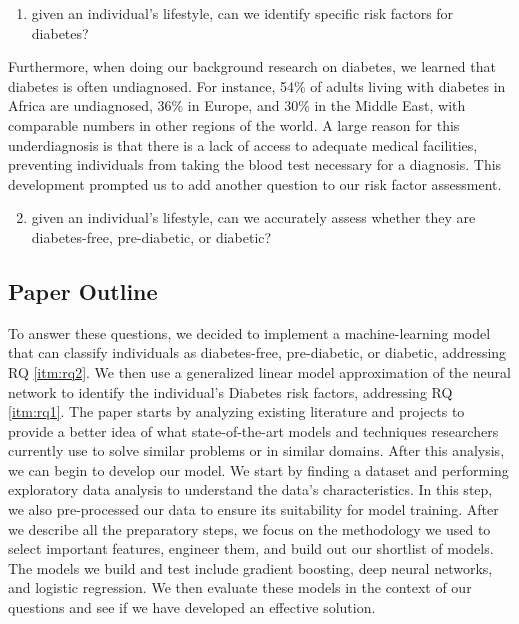 \documentclass[conference]{IEEEtran}
\begin{document}
\begin{enumerate}[label=\roman*.]
    \item given an individual’s lifestyle, can we identify specific risk factors for diabetes? \label{itm:rq1}
\end{enumerate}

\indent Furthermore, when doing our background research on diabetes, we learned that diabetes is often undiagnosed. For instance, 54\% of adults living with diabetes in Africa are undiagnosed, 36\% in Europe, and 30\% in the Middle East, with comparable numbers in other regions of the world\cite{b4}. A large reason for this underdiagnosis is that there is a lack of access to adequate medical facilities, preventing individuals from taking the blood test necessary for a diagnosis\cite{b2}. This development prompted us to add another question to our risk factor assessment.

\begin{enumerate}[label=\roman*.]
    \setcounter{enumi}{1}
    \item given an individual’s lifestyle, can we accurately assess whether they are diabetes-free, pre-diabetic, or diabetic? \label{itm:rq2}
\end{enumerate}


\subsection{Paper Outline}
To answer these questions, we decided to implement a machine-learning model that can classify individuals as diabetes-free, pre-diabetic, or diabetic, addressing RQ \ref{itm:rq2}. We then use a generalized linear model approximation of the neural network to identify the individual’s Diabetes risk factors, addressing RQ \ref{itm:rq1}. The paper starts by analyzing existing literature and projects to provide a better idea of what state-of-the-art models and techniques researchers currently use to solve similar problems or in similar domains. After this analysis, we can begin to develop our model. We start by finding a dataset and performing exploratory data analysis to understand the data’s characteristics. In this step, we also pre-processed our data to ensure its suitability for model training. After we describe all the preparatory steps, we focus on the methodology we used to select important features, engineer them, and build out our shortlist of models. The models we build and test include gradient boosting, deep neural networks, and logistic regression. We then evaluate these models in the context of our questions and see if we have developed an effective solution.
\end{document}
